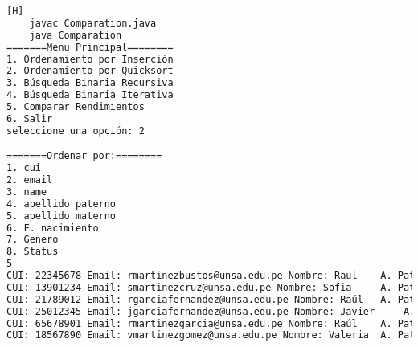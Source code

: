    	\begin{lstlisting}[language=bash,caption={Compilación y ejecución del código}][H]
    javac Comparation.java
    java Comparation
=======Menu Principal========
1. Ordenamiento por Inserción
2. Ordenamiento por Quicksort
3. Búsqueda Binaria Recursiva
4. Búsqueda Binaria Iterativa
5. Comparar Rendimientos
6. Salir
seleccione una opción: 2

=======Ordenar por:========
1. cui
2. email
3. name
4. apellido paterno
5. apellido materno
6. F. nacimiento
7. Genero
8. Status
5
CUI: 22345678 Email: rmartinezbustos@unsa.edu.pe Nombre: Raul	 A. Pat: Martinez A. Mat: Bustos Fecha de Nacimiento: 1988-10-30 Genero: 1 Estado: 1
CUI: 13901234 Email: smartinezcruz@unsa.edu.pe Nombre: Sofia	 A. Pat: Martinez A. Mat: Cruz Fecha de Nacimiento: 1994-05-18 Genero: 0 Estado: 1
CUI: 21789012 Email: rgarciafernandez@unsa.edu.pe Nombre: Raúl	 A. Pat: Garcia A. Mat: Fernandez Fecha de Nacimiento: 1992-07-22 Genero: 1 Estado: 1
CUI: 25012345 Email: jgarciafernandez@unsa.edu.pe Nombre: Javier	 A. Pat: Garcia A. Mat: Fernandez Fecha de Nacimiento: 1998-02-17 Genero: 1 Estado: 1
CUI: 65678901 Email: rmartinezgarcia@unsa.edu.pe Nombre: Raúl	 A. Pat: Martinez A. Mat: Garcia Fecha de Nacimiento: 1991-06-20 Genero: 0 Estado: 1
CUI: 18567890 Email: vmartinezgomez@unsa.edu.pe Nombre: Valeria	 A. Pat: Martinez A. Mat: Gomez Fecha de Nacimiento: 1997-07-03 Genero: 0 Estado: 1

  \end{lstlisting}
  
